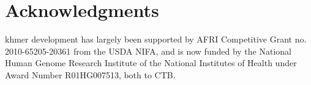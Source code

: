 \documentclass[10pt]{article}
\begin{document}







\section*{Acknowledgments}

khmer development has largely been supported by AFRI Competitive Grant
no. 2010-65205-20361 from the USDA NIFA, and is now funded by the
National Human Genome Research Institute of the National Institutes of
Health under Award Number R01HG007513, both to CTB.





\end{document}
